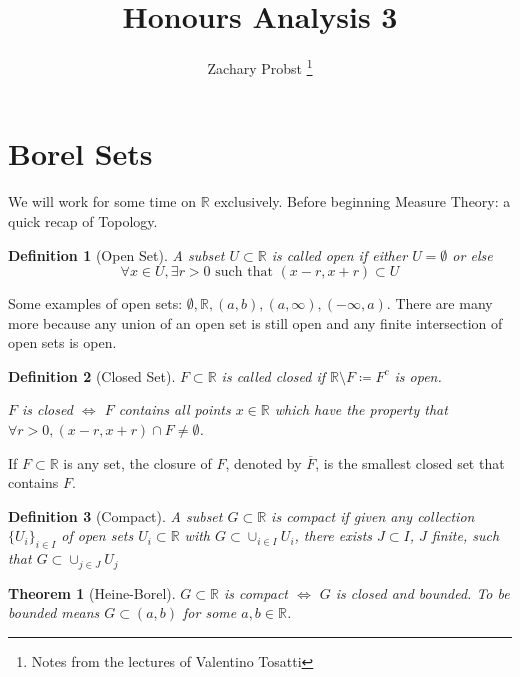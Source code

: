 \documentclass[11pt]{article}
\title{Honours Analysis 3}
\author{Zachary Probst \thanks{Notes from the lectures of Valentino Tosatti}}
\newtheorem{theorem}{Theorem}[section]
\newtheorem{definition}{Definition}[section]
\begin{document}
    \maketitle


    \section{Borel Sets}\label{sec:borel-sets}

    We will work for some time on $\mathbb{R}$ exclusively.
    Before beginning Measure Theory: a quick recap of Topology.

    \begin{definition}[Open Set]
        A subset $U \subset \mathbb{R}$ is called \emph{open} if either $U = \emptyset$ or else
        \[
            \forall x \in U, \exists r > 0 \text{ such that } (x-r,x+r) \subset U
        \]
    \end{definition}

    Some examples of open sets: $\emptyset, \mathbb{R}, (a,b), (a,\infty), (-\infty, a)$.
    There are many more because any union of an open set is still open and any finite intersection of open sets is open.

    \begin{definition}[Closed Set]
        $F \subset \mathbb{R}$ is called \emph{closed} if $\mathbb{R} \setminus F \coloneqq F^c $ is open.

        $F$ is closed $\iff$ $F$ contains all points $x \in \mathbb{R}$ which have the property that $\forall r > 0, (x-r, x+r) \cap F \neq \emptyset$.
    \end{definition}

    If $F \subset \mathbb{R}$ is any set, the closure of $F$, denoted by $\overline{F}$, is the smallest closed set that contains $F$.

    \begin{definition}[Compact]
        A subset $G \subset \mathbb{R}$ is \emph{compact} if given any collection $\{ U_i \}_{i \in I}$ of open sets $U_i \subset \mathbb{R}$ with $G \subset \cup_{i \in I} U_i$, there exists $J \subset I$, $J$ finite, such that $G \subset \cup_{j \in J} U_j$
    \end{definition}

    \begin{theorem}[Heine-Borel]
        $G \subset \mathbb{R}$ is compact $\iff$ $G$ is closed and bounded.
        To be bounded means $G \subset (a,b)$ for some $a,b \in \mathbb{R}$.
    \end{theorem}
\end{document}

